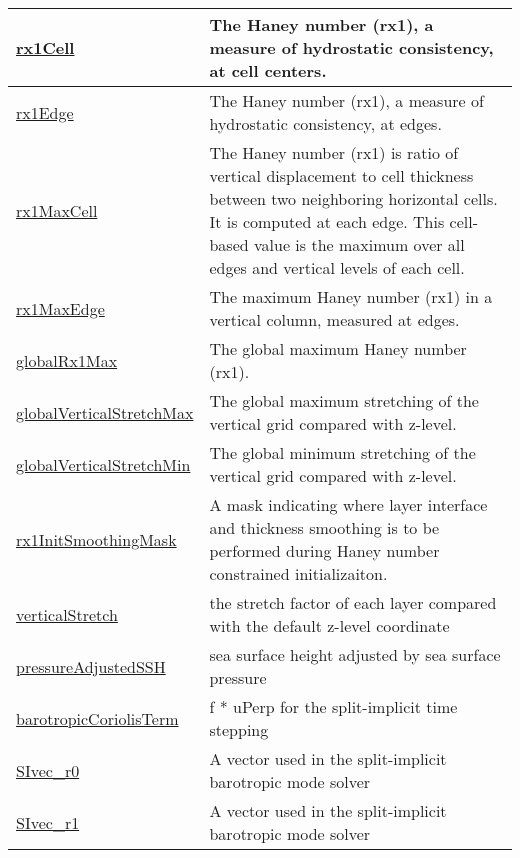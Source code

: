 {\begin{center}
\begin{longtable}{| p{2.0in} | p{4.0in} |}
    \hline
    \hyperref[subsec:var_sec_diagnostics_rx1Cell]{rx1Cell} & The Haney number (rx1), a measure of hydrostatic consistency, at cell centers. \\
    \hline
    \hyperref[subsec:var_sec_diagnostics_rx1Edge]{rx1Edge} & The Haney number (rx1), a measure of hydrostatic consistency, at edges. \\
    \hline
    \hyperref[subsec:var_sec_diagnostics_rx1MaxCell]{rx1MaxCell} & The Haney number (rx1) is ratio of vertical displacement to cell thickness between two neighboring horizontal cells.  It is computed at each edge.  This cell-based value is the maximum over all edges and vertical levels of each cell. \\
    \hline
    \hyperref[subsec:var_sec_diagnostics_rx1MaxEdge]{rx1MaxEdge} & The maximum Haney number (rx1) in a vertical column, measured at edges. \\
    \hline
    \hyperref[subsec:var_sec_diagnostics_globalRx1Max]{globalRx1Max} & The global maximum Haney number (rx1). \\
    \hline
    \hyperref[subsec:var_sec_diagnostics_globalVerticalStretchMax]{globalVerticalStretchMax} & The global maximum stretching of the vertical grid compared with z-level. \\
    \hline
    \hyperref[subsec:var_sec_diagnostics_globalVerticalStretchMin]{globalVerticalStretchMin} & The global minimum stretching of the vertical grid compared with z-level. \\
    \hline
    \hyperref[subsec:var_sec_diagnostics_rx1InitSmoothingMask]{rx1InitSmoothingMask} & A mask indicating where layer interface and thickness smoothing is to be performed during Haney number constrained initializaiton. \\
    \hline
    \hyperref[subsec:var_sec_diagnostics_verticalStretch]{verticalStretch} & the stretch factor of each layer compared with the default z-level coordinate \\
    \hline
    \hyperref[subsec:var_sec_diagnostics_pressureAdjustedSSH]{pressureAdjustedSSH} & sea surface height adjusted by sea surface pressure \\
    \hline
    \hyperref[subsec:var_sec_diagnostics_barotropicCoriolisTerm]{barotropicCoriolisTerm} & f * uPerp for the split-implicit time stepping \\
    \hline
    \hyperref[subsec:var_sec_diagnostics_SIvec_r0]{SIvec\_r0} & A vector used in the split-implicit barotropic mode solver \\
    \hline
    \hyperref[subsec:var_sec_diagnostics_SIvec_r1]{SIvec\_r1} & A vector used in the split-implicit barotropic mode solver \\

\end{longtable}
\end{center}}

